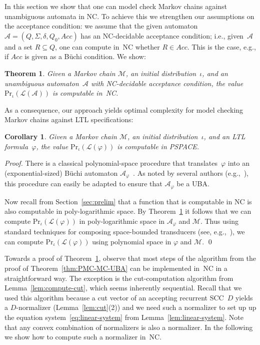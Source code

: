 \documentclass{elsarticle}
\newtheorem{theorem}[definition]{Theorem}
\newtheorem{corollary}[definition]{Corollary}
\def\cA{\mathcal{A}}
\def\cL{\mathcal{L}}
\def\cM{\mathcal{M}}
\def\Pr{\mathrm{Pr}}
\def\Acc{\mathit{Acc}}
\begin{document}
In this section we show that one can model check Markov chains against unambiguous automata in NC.
To achieve this we strengthen our assumptions on the acceptance condition:
we assume that the given automaton $\cA = (Q,\Sigma,\delta,Q_0,\Acc)$ has an NC-decidable acceptance condition; i.e., given~$\cA$ and a set $R \subseteq Q$, one can compute in~NC whether $R \in \Acc$.
This is the case, e.g., if $\Acc$ is given as a B\"uchi condition.
We show:
\begin{theorem} \label{thm:NC}
  Given a Markov chain $\cM$, an initial distribution~$\iota$, and an unambiguous automaton~$\cA$ with NC-decidable acceptance condition,
  the value $\Pr_\iota(\cL(\cA))$ is computable in~NC.
\end{theorem}
As a consequence, our approach yields optimal complexity for model checking Markov chains against LTL specifications:
\begin{corollary} \label{cor:LTL-PSPACE} Given a Markov chain $\cM$,
  an initial distribution~$\iota$, and an LTL formula~$\varphi$, the
  value $\Pr_\iota(\cL(\varphi))$ is computable in PSPACE.
\end{corollary}
\begin{proof}
  There is a classical polynomial-space procedure that
  translates~$\varphi$ into an (exponential-sized) B\"{u}chi automaton
  $\cA_\varphi$~\cite{VardiWolper86}.  As noted by several authors
  (e.g.,~\cite{ChaKat14,CouSahSut03}), this procedure can easily be
  adapted to ensure that $\cA_\varphi$ be a UBA.

  Now recall from Section~\ref{sec:prelim} that a function that is
  computable in NC is also computable in poly-logarithmic space. By
  Theorem~\ref{thm:NC} it follows that we can compute
  $\Pr_\iota(\cL(\varphi))$ in poly-logarithmic space in $\cA_\varphi$
  and $\cM$.  Thus using standard techniques for composing
  space-bounded transducers (see, e.g.,~\cite[Proposition
  8.2]{Pap94}), we can compute $\Pr_\iota(\cL(\varphi))$ using
  polynomial space in $\varphi$ and $\cM$. \qed
\end{proof}

Towards a proof of Theorem~\ref{thm:NC}, observe that most steps of
the algorithm from the proof of Theorem~\ref{thm:PMC-MC-UBA} can be
implemented in~NC in a straightforward way.  The exception is the
cut-computation algorithm from Lemma~\ref{lem:compute-cut}, which
seems inherently sequential.  Recall that we used this algorithm
because a cut vector of an accepting recurrent SCC~$D$ yields a
$D$-normalizer (Lemma~\ref{lem:cut}(2)) and we need such a normalizer
to set up up the equation system~\eqref{eq:linear-system} from
Lemma~\ref{lem:linear-system}.  Note that any convex combination of
normalizers is also a normalizer.  In the following we show how to
compute such a normalizer in~NC.
\end{document}
